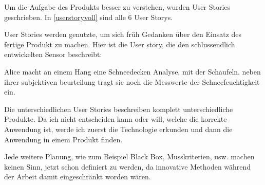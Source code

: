 Um die Aufgabe des Produkts besser zu verstehen, wurden User Stories geschrieben. In  \ref{userstoryvoll} sind alle 6 User Storys.

User Stories werden genutzte, um sich früh Gedanken über den Einsatz des fertige Produkt zu machen. Hier ist die User story, die den schlussendlich entwickelten Sensor beschreibt:

Alice macht an einem Hang eine Schneedecken Analyse, mit der Schaufeln. neben ihrer subjektiven beurteilung tragt sie noch die Messwerte der Schneefeuchtigkeit ein.

Die unterschiedlichen User Stories beschreiben komplett unterschiedliche Produkte. Da ich nicht entscheiden kann oder will, welche die korrekte Anwendung ist, werde ich zuerst die Technologie erkunden und dann die Anwendung in einem Produkt finden.

Jede weitere Planung, wie zum Beispiel Black Box, Musskriterien, usw. machen keinen Sinn, jetzt schon definiert zu werden, da innovative Methoden während der Arbeit damit eingeschränkt worden wären.



\iffalse

Um die Aufgabe der produktentwicklung besser zu verstehen, wurden User storys geschrieben. In \ref{userstoryvoll} sind alle 6 User Storys.

das ziel der Userstorys ist es fruh sich gedanken uber das fertige produkt zu machen. Hier ist die User story die das schlussendlichten entwickelten sensor beschreibt.

Alice macht an einem hang einen schedeckenanalyse, mit der schaufeln. neben ihrer subkektiven beurteilung tragt sie noch die messwerte der schneefeuchtikeit ein.


Die Userstorys beschreiben komplett unterschiedliche Produkte. da ich nicht entscheiden kann oder will, welches die korrekte Anwendung ist, werde ich zu erst die Technologie erkunden und dann die anwendung in ein Produkt finden.

jede weiteren pflichenheft aktivitaten, wie zum beispiel black box, Musskriteren, usw. machen keinen sinn jetzt schon definiert zu werden. da spanneden Entdecknugen währen der arbeit damit eingeschränkt werden.

\fi
